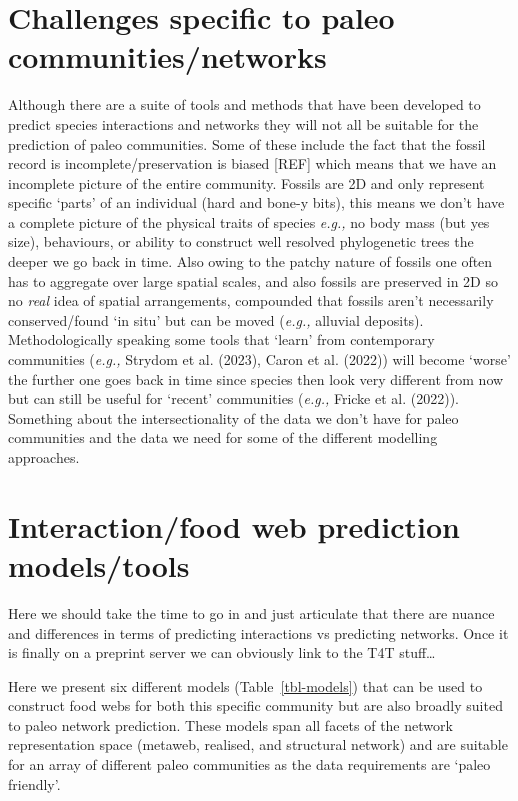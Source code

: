 \documentclass[
]{article}
\begin{document}
\section{Challenges specific to paleo
communities/networks}\label{challenges-specific-to-paleo-communitiesnetworks}

Although there are a suite of tools and methods that have been developed
to predict species interactions and networks they will not all be
suitable for the prediction of paleo communities. Some of these include
the fact that the fossil record is incomplete/preservation is biased
{[}REF{]} which means that we have an incomplete picture of the entire
community. Fossils are 2D and only represent specific `parts' of an
individual (hard and bone-y bits), this means we don't have a complete
picture of the physical traits of species \emph{e.g.,} no body mass (but
yes size), behaviours, or ability to construct well resolved
phylogenetic trees the deeper we go back in time. Also owing to the
patchy nature of fossils one often has to aggregate over large spatial
scales, and also fossils are preserved in 2D so no \emph{real} idea of
spatial arrangements, compounded that fossils aren't necessarily
conserved/found `in situ' but can be moved (\emph{e.g.,} alluvial
deposits). Methodologically speaking some tools that `learn' from
contemporary communities (\emph{e.g.,} Strydom et al. (2023), Caron et
al. (2022)) will become `worse' the further one goes back in time since
species then look very different from now but can still be useful for
`recent' communities (\emph{e.g.,} Fricke et al. (2022)). Something
about the intersectionality of the data we don't have for paleo
communities and the data we need for some of the different modelling
approaches.

\section{Interaction/food web prediction
models/tools}\label{interactionfood-web-prediction-modelstools}

Here we should take the time to go in and just articulate that there are
nuance and differences in terms of predicting interactions vs predicting
networks. Once it is finally on a preprint server we can obviously link
to the T4T stuff\ldots{}

Here we present six different models (Table~\ref{tbl-models}) that can
be used to construct food webs for both this specific community but are
also broadly suited to paleo network prediction. These models span all
facets of the network representation space (metaweb, realised, and
structural network) and are suitable for an array of different paleo
communities as the data requirements are `paleo friendly'.
\end{document}
